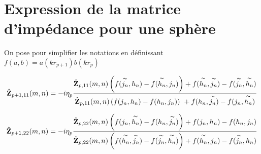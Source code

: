 \section{Expression de la matrice d'impédance pour une sphère}
\label{sec:annex:imp_sphere}



On pose pour simplifier les notations en définissant \(f(a,b)=a(kr_{p+1})b(kr_p)\)

\begin{equation}
      \hat{\mathbf{Z}}_{p+1,11}(m,n) = -i\eta_p
        \dfrac{\hat{\mathbf{Z}}_{p,11}(m,n) \left( f(\overset{\thicksim}{j_n},h_n) - f(\overset{\thicksim}{h_n},j_n) \right) + f(\overset{\thicksim}{h_n},\overset{\thicksim}{j_n}) - f(\overset{\thicksim}{j_n},\overset{\thicksim}{h_n})}{\hat{\mathbf{Z}}_{p,11}(m,n) \left( f(j_n,h_n) - f(h_n,j_n) \right) \\ + f(h_n,\overset{\thicksim}{j_n}) - f(j_n,\overset{\thicksim}{h_n})}
\end{equation}

\begin{equation}
      \hat{\mathbf{Z}}_{p+1,22}(m,n) = -i\eta_p
      \dfrac{\hat{\mathbf{Z}}_{p,22}(m,n) \left( f(j_n,\overset{\thicksim}{h_n}) - f(h_n,\overset{\thicksim}{j_n}) \right) + f(j_n,h_n) - f(h_n,j_n) }{\hat{\mathbf{Z}}_{p,22}(m,n) \left( f(\overset{\thicksim}{h_n},\overset{\thicksim}{j_n}) - f(\overset{\thicksim}{j_n},\overset{\thicksim}{h_n}) \right) + f(\overset{\thicksim}{h_n},j_n) - f(\overset{\thicksim}{j_n},h_n)}
\end{equation}